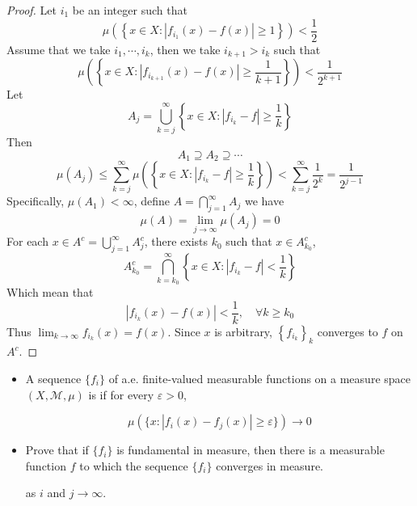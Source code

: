 \documentclass[../main.tex]{subfiles}
\begin{document}
\begin{proof}
    Let \(  i_1  \) be an integer such that \[
    \mu \left( \left\{ x\in X: \left| f_{i_1}\left( x \right) -f\left( x \right)  \right|\ge 1  \right\} \right) < \frac{1 }{2 } 
    \] Assume that we take \(  i_1,\cdots ,i_{k}  \), then we take \(  i_{k+ 1} > i_{k}  \) such that \[
    \mu \left( \left\{ x \in X: \left| f_{i_{k+ 1}}\left( x \right) -f\left( x \right)  \right|\ge \frac{1 }{k+ 1 }   \right\} \right) < \frac{1 }{2^{k+ 1} }  
    \]  Let \[
    A_{j}= \bigcup _{k= j}^{\infty} \left\{ x \in X: \left| f_{i_{k}}-f \right|\ge \frac{1 }{k }   \right\}
    \]Then \[
  A_1\supseteq A_2\supseteq \cdots 
    \] \[
    \mu \left( A_{j} \right)\le \sum _{k= j}^{\infty} \mu \left( \left\{ x \in X: \left| f_{i_{k}}-f \right| \ge \frac{1 }{k }  \right\} \right)  < \sum _{k= j}^{\infty}\frac{1 }{2^{k} }= \frac{1 }{2^{j - 1} }  
    \] Specifically, \(  \mu \left( A_1 \right)< \infty   \), define \(  A= \bigcap _{j= 1}^{\infty}A_{j}  \) we have \[
    \mu \left( A \right)= \lim_{j\to \infty}\mu \left( A_{j} \right)= 0  
    \] For each \(  x \in A^{c}= \bigcup _{j= 1}^{\infty}A_{j}^{c}  \),  there exists \(  k_0  \) such that \(  x \in A_{k_0}^{c}  \), \[
    A_{k_0}^{c}= \bigcap _{k= k_0}^{\infty}\left\{ x \in X: \left| f_{i_{k}}-f \right|< \frac{1 }{k }   \right\}
    \]  Which mean that \[
    \left| f_{i_{k}}\left( x \right)-f\left( x \right)   \right|< \frac{1 }{k }, \quad \forall k  \ge k_0
    \]Thus \(  \lim_{k\to \infty}f_{i_{k}}\left( x \right)= f\left( x \right)    \). Since \(  x   \) is arbitrary, \(  \left\{ f_{i_{k}} \right\}_{k}  \) converges to \(  f  \) on \(  A^{c}  \).     
\end{proof}

\begin{theorem}{}{}
   \begin{itemize}
    \item  A sequence $\{f_i\}$ of a.e. finite-valued measurable functions on a measure space $(X, \mathcal{M}, \mu)$ is  if for every $\varepsilon > 0$,

\[
\mu(\{x : |f_i(x) - f_j(x)| \geq \varepsilon\}) \to 0
\]
\item 
Prove that if $\{f_i\}$ is fundamental in measure, then there is a measurable function $f$ to which the sequence $\{f_i\}$ converges in measure.

as $i$ and $j \to \infty$. 

   \end{itemize}
   
\end{theorem}
\end{document}
